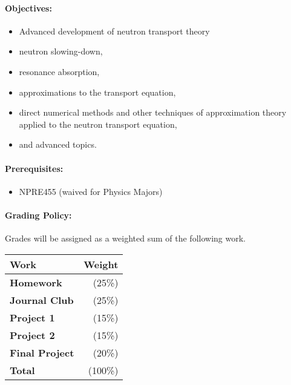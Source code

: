 \documentclass[11pt, a4paper]{article}
\begin{document}

\renewcommand{\refname}{\normalfont\selectfont\normalsize}\vspace{-1cm}


\paragraph{Objectives:}
\begin{itemize}
\item Advanced development of neutron transport theory
\item  neutron slowing-down,
\item resonance absorption,
\item  approximations to the transport equation,
\item  direct numerical methods and other techniques of approximation theory 
        applied to the neutron transport equation,
\item  and advanced topics. 
\end{itemize}

\paragraph{Prerequisites:}
\begin{itemize}
\item NPRE455 (waived for Physics Majors) 
\end{itemize}

\paragraph{Grading Policy:} Grades will be assigned as a weighted sum of the
following work.

\begin{table}[h]
\begin{tabularx}{\textwidth}{Xr}
        \textbf{Work} & \textbf{Weight} \\
\hline
\textbf{Homework}               & (25\%)  \\
\textbf{Journal Club}           & (25\%)  \\
\textbf{Project 1}              & (15\%)  \\
\textbf{Project 2}              & (15\%)  \\
\textbf{Final Project}          & (20\%)  \\
\hline
\textbf{Total}                  & (100\%)\\
\end{tabularx}
\end{table}
\end{document}
